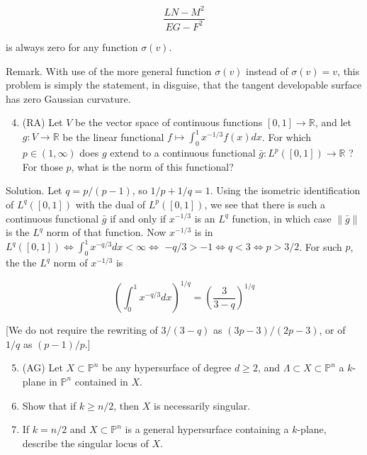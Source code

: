 \documentclass[10pt]{article}
\begin{document}
$$
\frac{L N-M^{2}}{E G-F^{2}}
$$

is always zero for any function $\sigma(v)$.

Remark. With use of the more general function $\sigma(v)$ instead of $\sigma(v)=v$, this problem is simply the statement, in disguise, that the tangent developable surface has zero Gaussian curvature.

\begin{enumerate}
  \setcounter{enumi}{3}
  \item (RA) Let $V$ be the vector space of continuous functions $[0,1] \rightarrow \mathbb{R}$, and let $g: V \rightarrow \mathbb{R}$ be the linear functional $f \mapsto \int_{0}^{1} x^{-1 / 3} f(x) d x$. For which $p \in(1, \infty)$ does $g$ extend to a continuous functional $\bar{g}: L^{p}([0,1]) \rightarrow \mathbb{R}$ ? For those $p$, what is the norm of this functional?
\end{enumerate}

Solution. Let $q=p /(p-1)$, so $1 / p+1 / q=1$. Using the isometric identification of $L^{q}([0,1])$ with the dual of $L^{p}([0,1])$, we see that there is such a continuous functional $\bar{g}$ if and only if $x^{-1 / 3}$ is an $L^{q}$ function, in which case $\|\bar{g}\|$ is the $L^{q}$ norm of that function. Now $x^{-1 / 3}$ is in $L^{q}([0,1]) \Leftrightarrow \int_{0}^{1} x^{-q / 3} d x<\infty \Leftrightarrow$ $-q / 3>-1 \Leftrightarrow q<3 \Leftrightarrow p>3 / 2$. For such $p$, the the $L^{q}$ norm of $x^{-1 / 3}$ is

$$
\left(\int_{0}^{1} x^{-q / 3} d x\right)^{1 / q}=\left(\frac{3}{3-q}\right)^{1 / q}
$$

[We do not require the rewriting of $3 /(3-q)$ as $(3 p-3) /(2 p-3)$, or of $1 / q$ as $(p-1) / p$.]

\begin{enumerate}
  \setcounter{enumi}{4}
  \item (AG) Let $X \subset \mathbb{P}^{n}$ be any hypersurface of degree $d \geq 2$, and $\Lambda \subset X \subset \mathbb{P}^{n}$ a $k$-plane in $\mathbb{P}^{n}$ contained in $X$.

  \item Show that if $k \geq n / 2$, then $X$ is necessarily singular.

  \item If $k=n / 2$ and $X \subset \mathbb{P}^{n}$ is a general hypersurface containing a $k$-plane, describe the singular locus of $X$.

\end{enumerate}
\end{document}
